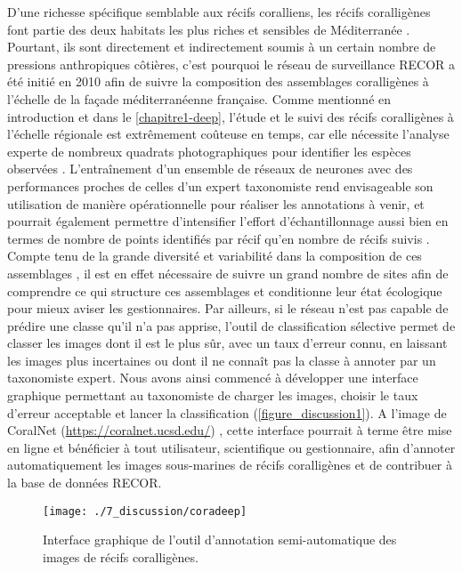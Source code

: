 D’une richesse spécifique semblable aux récifs coralliens, les récifs coralligènes font partie des deux habitats les plus riches et sensibles de Méditerranée \citep{boudouresque_marine_2004}. Pourtant, ils sont directement et indirectement soumis à un certain nombre de pressions anthropiques côtières, c’est pourquoi le réseau de surveillance RECOR a été initié en 2010 afin de suivre la composition des assemblages coralligènes à l’échelle de la façade méditerranéenne française. Comme mentionné en introduction et dans le \autoref{chapitre1-deep}, l’étude et le suivi des récifs coralligènes à l’échelle régionale est extrêmement coûteuse en temps, car elle nécessite l’analyse experte de nombreux quadrats photographiques pour identifier les espèces observées \citep{kipson_rapid_2011, deter_rapid_2012, sartoretto_integrated_2017}. L’entraînement d’un ensemble de réseaux de neurones avec des performances proches de celles d’un expert taxonomiste rend envisageable son utilisation de manière opérationnelle pour réaliser les annotations à venir, et pourrait également permettre d’intensifier l’effort d’échantillonnage aussi bien en termes de nombre de points identifiés par récif qu’en nombre de récifs suivis \citep{beijbom_towards_2015}. Compte tenu de la grande diversité et variabilité dans la composition de ces assemblages \citep{kipson_rapid_2011}, il est en effet nécessaire de suivre un grand nombre de sites afin de comprendre ce qui structure ces assemblages et conditionne leur état écologique pour mieux aviser les gestionnaires. Par ailleurs, si le réseau n’est pas capable de prédire une classe qu’il n’a pas apprise, l’outil de classification sélective permet de classer les images dont il est le plus sûr, avec un taux d’erreur connu, en laissant les images plus incertaines ou dont il ne connaît pas la classe à annoter par un taxonomiste expert. Nous avons ainsi commencé à développer une interface graphique permettant au taxonomiste de charger les images, choisir le taux d’erreur acceptable et lancer la classification (\autoref{figure_discussion1}). A l’image de CoralNet (\href{https://coralnet.ucsd.edu/}{https://coralnet.ucsd.edu/}) \citep{beijbom_towards_2015}, cette interface pourrait à terme être mise en ligne et bénéficier à tout utilisateur, scientifique ou gestionnaire, afin d’annoter automatiquement les images sous-marines de récifs coralligènes et de contribuer à la base de données RECOR.

\begin{figure}[H]
	\begin{center}
	\texttt{[image: ./7\_discussion/coradeep]}
		\caption{Interface graphique de l’outil d’annotation semi-automatique des images de récifs coralligènes.}
	\label{figure_discussion1}
\end{center}
\end{figure}

